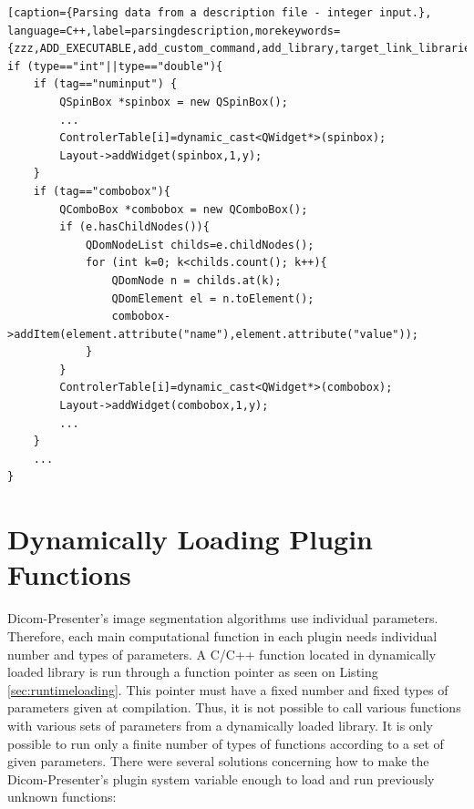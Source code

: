 \begin{lstlisting}[caption={Parsing data from a description file - integer input.}, language=C++,label=parsingdescription,morekeywords={zzz,ADD_EXECUTABLE,add_custom_command,add_library,target_link_libraries,OUTPUT,COMMAND,xxx})]
if (type=="int"||type=="double"){
	if (tag=="numinput") {
		QSpinBox *spinbox = new QSpinBox();
		...
		ControlerTable[i]=dynamic_cast<QWidget*>(spinbox); 
		Layout->addWidget(spinbox,1,y);
	}	
	if (tag=="combobox"){
		QComboBox *combobox = new QComboBox();
		if (e.hasChildNodes()){
			QDomNodeList childs=e.childNodes();
			for (int k=0; k<childs.count(); k++){
				QDomNode n = childs.at(k);
				QDomElement el = n.toElement();
				combobox->addItem(element.attribute("name"),element.attribute("value"));
			}					
		}
		ControlerTable[i]=dynamic_cast<QWidget*>(combobox); 
		Layout->addWidget(combobox,1,y);
		...
	}
	...	
}
\end{lstlisting}







\section{Dynamically Loading Plugin Functions}

Dicom-Presenter's image segmentation algorithms use individual parameters. Therefore, each main computational function in each plugin needs individual number and types of parameters. A C/C++ function located in dynamically loaded library is run through a function pointer as seen on Listing \ref{sec:runtimeloading}. This pointer must have a fixed number and fixed types of parameters given at compilation. Thus, it is not possible to call various functions with various sets of parameters from a dynamically loaded library. It is only possible to run only a finite number of types of functions according to a set of given parameters. There were several solutions concerning how to make the Dicom-Presenter's plugin system variable enough to load and run previously unknown functions:

